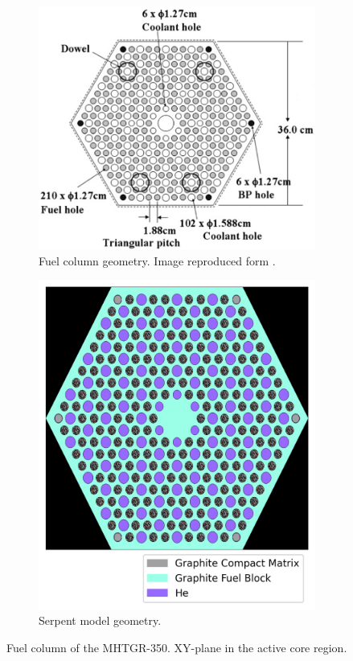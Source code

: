\documentclass[11pt,letterpaper]{article}
\begin{document}
\begin{figure}[htbp!]
	\centering
	\begin{subfigure}[t]{0.4\textwidth}
		\centering
		\includegraphics[width=\linewidth]{figures/fuel-assembly}
		\caption{Fuel column geometry. Image reproduced form \cite{tak_numerical_2008}.}
	\end{subfigure}
	\begin{subfigure}[t]{0.4\textwidth}
		\centering
		\includegraphics[width=\linewidth]{figures/oecd-standard-column-legend}
		\caption{Serpent model geometry.}
	\end{subfigure}
	\hfill
	\caption{Fuel column of the MHTGR-350. XY-plane in the active core region.}
	\label{fig:}
\end{figure}
\end{document}
